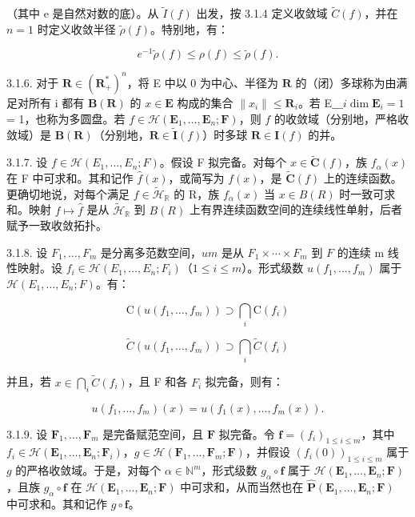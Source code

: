 （其中 e 是自然对数的底）。从 \(\tilde{I}(f)\) 出发，按 3.1.4 定义收敛域 \(\tilde{C}(f)\)，并在 \(n = 1\) 时定义收敛半径 \(\tilde{\rho}(f)\)。特别地，有：

\[
e ^ {- 1} \tilde {\rho} (f) \leqslant \rho (f) \leqslant \tilde {\rho} (f).
\]

3.1.6. 对于 \(\mathbf{R} \in (\mathbf{R}_{+}^{*})^{n}\)，将 E 中以 0 为中心、半径为 \(\mathbf{R}\) 的（闭）多球称为由满足对所有 i 都有 \(\mathbf{B}(\mathbf{R})\) 的 \(x \in \mathbf{E}\) 构成的集合 \(\|x_{i}\| \leqslant \mathbf{R}_{i}\)。若  E＿\(i\)\(\dim \mathbf{E}_{i} = 1\) = 1，也称为多圆盘。若 \(f \in \mathcal{H}(\mathbf{E}_{1}, \ldots, \mathbf{E}_{n}; \mathbf{F})\)，则 \(f\) 的收敛域（分别地，严格收敛域）是 \(\mathbf{B}(\mathbf{R})\)（分别地，\(\mathbf{R} \in \tilde{\mathbf{I}}(f)\)）时多球 \(\mathbf{R} \in \mathbf{I}(f)\) 的并。

3.1.7. 设 \(f \in \mathcal{H}(E_1, \ldots, E_n; F)\)。假设 F 拟完备。对每个 \(x \in \tilde{\mathbf{C}}(f)\)，族 \(f_{\alpha}(x)\) 在 F 中可求和。其和记作 \(\hat{f}(x)\)，或简写为 \(f(x)\)，是 \(\tilde{\mathbf{C}}(f)\) 上的连续函数。更确切地说，对每个满足 \(f \in \tilde{\mathcal{H}}_{\mathbb{R}}\) 的 R，族 \(f_{\alpha}(x)\) 当 \(x \in B(R)\) 时一致可求和。映射 \(f \mapsto \hat{f}\) 是从 \(\tilde{\mathcal{H}}_{\mathbb{R}}\) 到 \(B(R)\) 上有界连续函数空间的连续线性单射，后者赋予一致收敛拓扑。

3.1.8. 设 \(F_1, \ldots, F_m\) 是分离多范数空间，\(u\)\(m\) 是从 \(F_1 \times \cdots \times F_m\) 到 \(F\) 的连续 m 线性映射。设 \(f_i \in \mathcal{H}(E_1, \ldots, E_n; F_i)\)（\(1 \leqslant i \leqslant m\)）。形式级数 \(u(f_1, \ldots, f_m)\) 属于 \(\mathcal{H}(E_1, \ldots, E_n; F)\)。有：

\[
\mathrm{C} (u (f _ {1}, \dots , f _ {m})) \supset \bigcap_ {i} \mathrm{C} (f _ {i})
\]

\[
\tilde {C} (u (f _ {1}, \dots , f _ {m})) \supset \bigcap_ {i} \tilde {C} (f _ {i})
\]

并且，若 \(x \in \bigcap_{i} \tilde{C}(f_i)\)，且 F 和各 \(F_i\) 拟完备，则有：

\[
u (f _ {1}, \dots , f _ {m}) (x) = u (f _ {1} (x), \dots , f _ {m} (x)).
\]

3.1.9. 设 \(\mathbf{F}_1, \ldots, \mathbf{F}_m\) 是完备赋范空间，且 \(\mathbf{F}\) 拟完备。令 \(\mathbf{f} = (f_i)_{1 \leqslant i \leqslant m}\)，其中 \(f_i \in \mathcal{H}(\mathbf{E}_1, \ldots, \mathbf{E}_n; \mathbf{F}_i)\)，\(g \in \mathcal{H}(\mathbf{F}_1, \ldots, \mathbf{F}_m; \mathbf{F})\)，并假设 \((f_i(0))_{1 \leqslant i \leqslant m}\) 属于 \(g\) 的严格收敛域。于是，对每个 \(\alpha \in \mathbb{N}^m\)，形式级数 \(g_\alpha \circ \mathbf{f}\) 属于 \(\mathcal{H}(\mathbf{E}_1, \ldots, \mathbf{E}_n; \mathbf{F})\)，且族 \(g_\alpha \circ \mathbf{f}\) 在 \(\mathcal{H}(\mathbf{E}_1, \ldots, \mathbf{E}_n; \mathbf{F})\) 中可求和，从而当然也在 \(\hat{\mathbf{P}}(\mathbf{E}_1, \ldots, \mathbf{E}_n; \mathbf{F})\) 中可求和。其和记作 \(g \circ \mathbf{f}\)。

